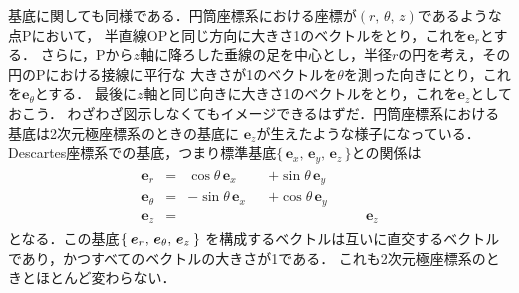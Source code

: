 基底に関しても同様である．円筒座標系における座標が$(r, \, \theta, \, z)$であるような点Pにおいて，
半直線OPと同じ方向に大きさ1のベクトルをとり，これを$\bm{e}_r$とする．
さらに，Pから$z$軸に降ろした垂線の足を中心とし，半径$r$の円を考え，その円のPにおける接線に平行な
大きさが1のベクトルを$\theta$を測った向きにとり，これを$\bm{e}_\theta$とする．
最後に$z$軸と同じ向きに大きさ1のベクトルをとり，これを$\bm{e}_z$としておこう．
わざわざ図示しなくてもイメージできるはずだ．円筒座標系における基底は2次元極座標系のときの基底に
$\bm{e}_z$が生えたような様子になっている．
Descartes座標系での基底，つまり標準基底$\{ \, \bm{e}_x, \, \bm{e}_y, \, \bm{e}_z \, \} $との関係は
\begin{align}
\begin{aligned}
\bm{e}_r& = & \cos \theta \, \bm{e}_x & & + \sin \theta \, \bm{e}_y & \\
\bm{e}_\theta & = &  - \sin \theta \, \bm{e}_x & & + \cos \theta \, \bm{e}_y & \\
\bm{e}_z & = & & & & \; \; \; \;\;\;\; \bm{e}_z
\label{eq:entoukiteihenkan}
\end{aligned}
\end{align}
となる．この基底$\Set{ \bm{e}_r , \, \bm{e}_\theta , \, \bm{e}_z}$
を構成するベクトルは互いに直交するベクトルであり，かつすべてのベクトルの大きさが1である．
これも2次元極座標系のときとほとんど変わらない．
